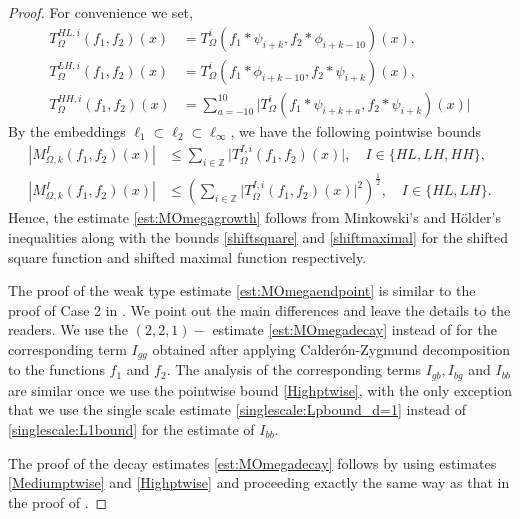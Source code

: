 \documentclass[a4paper,reqno]{amsart}
\newcommand{\Z}{{\mathbb Z}}
\theoremstyle{definition}
\numberwithin{equation}{section}
\begin{document}
\begin{proof}
	For convenience we set,
	\begin{equation}\label{notationforpieces}
		\begin{aligned}
		T_\Omega^{HL,i}(f_1,f_2)(x)&=T^i_\Omega(f_1*\psi_{i+k},f_2*\phi_{i+k-10})(x),\\
		T_\Omega^{LH,i}(f_1,f_2)(x)&=T^i_\Omega(f_1*\phi_{i+k-10},f_2*\psi_{i+k})(x),\\
		T_\Omega^{HH,i}(f_1,f_2)(x)&=\sum_{a=-10}^{10}\Big|T^i_\Omega(f_1*\psi_{i+k+a},f_2*\psi_{i+k})(x)\Big|
	\end{aligned}
	\end{equation}
	By the embeddings $\ell_1\subset\ell_2\subset\ell_\infty$, we have the following pointwise bounds
	\begin{align}
		|M_{\Omega,k}^{I}(f_1,f_2)(x)|&\leq\sum\limits_{i\in\Z}\Big|T^{I,i}_\Omega(f_1,f_2)(x)\Big|,\quad I\in\{HL,LH,HH\},\label{Highptwise}\\
		|M_{\Omega,k}^{I}(f_1,f_2)(x)|&\leq\left(\sum\limits_{i\in\Z}\Big|T^{I,i}_\Omega(f_1,f_2)(x)\Big|^2\right)^\frac{1}{2},\quad I\in\{HL,LH\}.\label{Mediumptwise}
	\end{align}
	Hence, the estimate \eqref{est:MOmegagrowth} follows from Minkowski's and H\"older's inequalities along with the bounds \eqref{shiftsquare} and \eqref{shiftmaximal} for the  shifted square function and shifted maximal function respectively.
	
	The proof of the weak type estimate \eqref{est:MOmegaendpoint} is similar to the proof of Case 2 in . We point out the main differences and leave the details to the readers. We use the $(2,2,1)-$ estimate \eqref{est:MOmegadecay} instead of  for the corresponding term $I_{gg}$ obtained after applying Calder\'on-Zygmund decomposition to the functions $f_1$ and $f_2$. The analysis of the corresponding terms $I_{gb},I_{bg}$ and $I_{bb}$ are similar once we use the pointwise bound \eqref{Highptwise}, with the only exception that we use the single scale estimate \eqref{singlescale:Lpbound_d=1} instead of \eqref{singlescale:L1bound} for the estimate of $I_{bb}$.

	The proof of the decay estimates \eqref{est:MOmegadecay} follows by using estimates \eqref{Mediumptwise} and \eqref{Highptwise} and proceeding exactly the same way as that in the proof of .
\end{proof}
\end{document}
